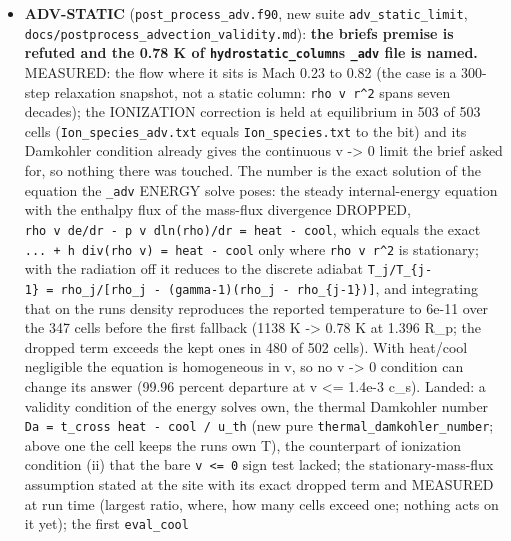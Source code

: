 \documentclass[english,a4paper]{my_memo}
\begin{document}
\begin{itemize}
  files move by 4.6e-8 (Ion\_species by 0.16 at cell 2 on values of 1e-182,
  denormal noise). The adv defect is recorded as an open item. \textbf{Goldens to
  be refreshed by the user} (archive first), then \texttt{make\ check} re-run.
\item
  \textbf{ADV-STATIC} (\texttt{post\_process\_adv.f90}, new suite \texttt{adv\_static\_limit},
  \texttt{docs/postprocess\_advection\_validity.md}): \textbf{the brief\textquotesingle s premise is
  refuted and the 0.78 K of \texttt{hydrostatic\_column}\textquotesingle s \texttt{\_adv} file is named.}
  MEASURED: the flow where it sits is Mach 0.23 to 0.82 (the case is a
  300-step relaxation snapshot, not a static column: \texttt{rho\ v\ r\^{}2} spans seven
  decades); the IONIZATION correction is held at equilibrium in 503 of 503
  cells (\texttt{Ion\_species\_adv.txt} equals \texttt{Ion\_species.txt} to the bit) and its
  Damkohler condition already gives the continuous v -\textgreater{} 0 limit the brief
  asked for, so nothing there was touched. The number is the exact solution
  of the equation the \texttt{\_adv} ENERGY solve poses: the steady internal-energy
  equation with the enthalpy flux of the mass-flux divergence DROPPED,
  \texttt{rho\ v\ de/dr\ -\ p\ v\ dln(rho)/dr\ =\ heat\ -\ cool}, which equals the exact
  \texttt{...\ +\ h\ div(rho\ v)\ =\ heat\ -\ cool} only where \texttt{rho\ v\ r\^{}2} is stationary;
  with the radiation off it reduces to the discrete adiabat \texttt{T\_j/T\_\{j-1\}\ =\ rho\_j/{[}rho\_j\ -\ (gamma-1)(rho\_j\ -\ rho\_\{j-1\}){]}}, and integrating that on the
  run\textquotesingle s density reproduces the reported temperature to 6e-11 over the 347
  cells before the first fallback (1138 K -\textgreater{} 0.78 K at 1.396 R\_p; the
  dropped term exceeds the kept ones in 480 of 502 cells). With heat/cool
  negligible the equation is homogeneous in v, so no v -\textgreater{} 0 condition can
  change its answer (99.96 percent departure at \textbar v\textbar{} \textless= 1.4e-3 c\_s). Landed:
  a validity condition of the energy solve\textquotesingle s own, the thermal Damkohler
  number \texttt{Da\ =\ t\_cross\ \textbar{}heat\ -\ cool\textbar{}\ /\ u\_th} (new pure
  \texttt{thermal\_damkohler\_number}; above one the cell keeps the run\textquotesingle s own T),
  the counterpart of ionization condition (ii) that the bare \texttt{v\ \textless{}=\ 0} sign
  test lacked; the stationary-mass-flux assumption stated at the site with
  its exact dropped term and MEASURED at run time (largest ratio, where, how
  many cells exceed one; nothing acts on it yet); the first \texttt{eval\_cool}

\end{itemize}
\end{document}
